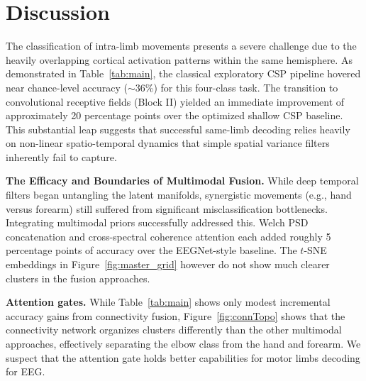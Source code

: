 \section{Discussion}
\label{sec:discussion}

The classification of intra-limb movements presents a severe challenge due to the heavily overlapping cortical activation patterns within the same hemisphere. As demonstrated in Table~\ref{tab:main}, the classical exploratory CSP pipeline hovered near chance-level accuracy ($\sim$36\%) for this four-class task. 
The transition to convolutional receptive fields (Block II) yielded an immediate improvement of approximately 20 percentage points over the optimized shallow CSP baseline. 
This substantial leap suggests that successful same-limb decoding relies heavily on non-linear spatio-temporal dynamics that simple spatial variance filters inherently fail to capture.

\textbf{The Efficacy and Boundaries of Multimodal Fusion.}
While deep temporal filters began untangling the latent manifolds, synergistic movements (e.g., hand versus forearm) still suffered from significant misclassification bottlenecks. 
Integrating multimodal priors successfully addressed this. Welch PSD concatenation and cross-spectral coherence attention each added roughly 5 percentage points of accuracy over the EEGNet-style baseline. 
The $t$-SNE embeddings in Figure~\ref{fig:master_grid} however do not show much clearer clusters in the fusion approaches.  

\textbf{Attention gates.}
While Table~\ref{tab:main} shows only modest incremental accuracy gains from connectivity fusion, 
Figure~\ref{fig:connTopo} shows that the connectivity network organizes clusters differently than the other multimodal approaches, effectively separating the elbow class from the hand and forearm. We suspect that the attention gate holds better capabilities for motor limbs decoding for EEG.

